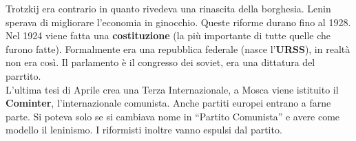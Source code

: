 Trotzkij era contrario in quanto rivedeva una rinascita della borghesia. Lenin sperava di migliorare
l'economia in ginocchio. Queste riforme durano fino al 1928.\\ [\baselineskip]
Nel 1924 viene fatta una \textbf{costituzione} (la più importante di tutte quelle che furono fatte).
Formalmente era una repubblica federale (nasce l'\textbf{URSS}), in realtà non era così. Il 
parlamento è il congresso dei soviet, era una dittatura del parrtito.\\
L'ultima tesi di Aprile crea una Terza Internazionale, a Mosca viene istituito il \textbf{Cominter},
l'internazionale comunista. Anche partiti europei entrano a farne parte. Si poteva solo se si 
cambiava nome in ``Partito Comunista'' e avere come modello il leninismo. I riformisti inoltre
vanno espulsi dal partito.
